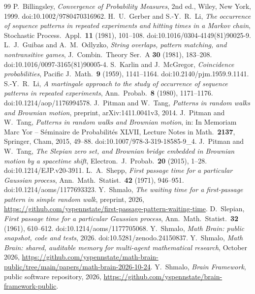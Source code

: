 \documentclass[11pt]{amsart}
\theoremstyle{remark}
\numberwithin{equation}{section}
\begin{document}
\begin{thebibliography}{99}
 P.~Billingsley, \emph{Convergence of Probability Measures}, 2nd ed., Wiley, New York, 1999. doi:10.1002/9780470316962.
 H.~U.~Gerber and S.-Y.~R.~Li, \emph{The occurrence of sequence patterns in repeated experiments and hitting times in a Markov chain}, Stochastic Process.\ Appl.\ \textbf{11} (1981), 101--108. doi:10.1016/0304-4149(81)90025-9.
 L.~J.~Guibas and A.~M.~Odlyzko, \emph{String overlaps, pattern matching, and nontransitive games}, J.\ Combin.\ Theory Ser.\ A \textbf{30} (1981), 183--208. doi:10.1016/0097-3165(81)90005-4.
 S.~Karlin and J.~McGregor, \emph{Coincidence probabilities}, Pacific J.\ Math.\ \textbf{9} (1959), 1141--1164. doi:10.2140/pjm.1959.9.1141.
 S.-Y.~R.~Li, \emph{A martingale approach to the study of occurrence of sequence patterns in repeated experiments}, Ann.\ Probab.\ \textbf{8} (1980), 1171--1176. doi:10.1214/aop/1176994578.
 J.~Pitman and W.~Tang, \emph{Patterns in random walks and Brownian motion}, preprint, arXiv:1411.0041v3, 2014.
 J.~Pitman and W.~Tang, \emph{Patterns in random walks and Brownian motion}, in: In Memoriam Marc Yor -- S\'eminaire de Probabilit\'es XLVII, Lecture Notes in Math.\ \textbf{2137}, Springer, Cham, 2015, 49--88. doi:10.1007/978-3-319-18585-9\_4.
 J.~Pitman and W.~Tang, \emph{The Slepian zero set, and Brownian bridge embedded in Brownian motion by a spacetime shift}, Electron.\ J.\ Probab.\ \textbf{20} (2015), 1--28. doi:10.1214/EJP.v20-3911.
 L.~A.~Shepp, \emph{First passage time for a particular Gaussian process}, Ann.\ Math.\ Statist.\ \textbf{42} (1971), 946--951. doi:10.1214/aoms/1177693323.
 Y.~Shmalo, \emph{The waiting time for a first-passage pattern in simple random walk}, preprint, 2026, \url{https://github.com/yspennstate/first-passage-pattern-waiting-time}.
 D.~Slepian, \emph{First passage time for a particular Gaussian process}, Ann.\ Math.\ Statist.\ \textbf{32} (1961), 610--612. doi:10.1214/aoms/1177705068.
 Y.~Shmalo, \emph{Math Brain: public snapshot, code and tests}, 2026. doi:10.5281/zenodo.24150837.
 Y.~Shmalo, \emph{Math Brain: shared, auditable memory for multi-agent mathematical research}, October 2026, \url{https://github.com/yspennstate/math-brain-public/tree/main/papers/math-brain-2026-10-24}.
 Y.~Shmalo, \emph{Brain Framework}, public software repository, 2026, \url{https://github.com/yspennstate/brain-framework-public}.
\end{thebibliography}
\end{document}
